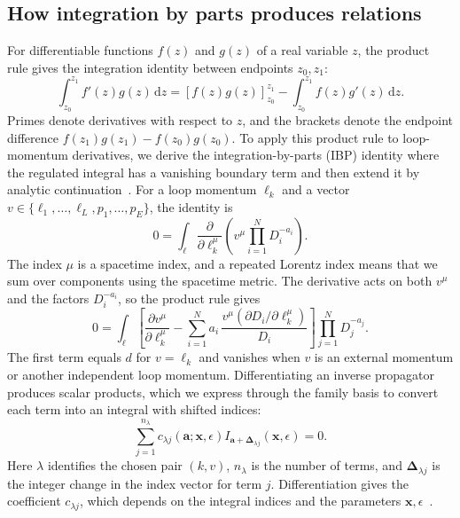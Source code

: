 \subsection{How integration by parts produces relations}
For differentiable functions $f(z)$ and $g(z)$ of a real variable $z$, the
product rule gives the integration identity between endpoints $z_0,z_1$:
\begin{equation}
 \int_{z_0}^{z_1} f'(z)g(z)\,\mathrm{d}z
 =[f(z)g(z)]_{z_0}^{z_1}
 -\int_{z_0}^{z_1} f(z)g'(z)\,\mathrm{d}z.
 \label{eq:ordinary-ibp}
\end{equation}
Primes denote derivatives with respect to $z$, and the brackets denote the
endpoint difference $f(z_1)g(z_1)-f(z_0)g(z_0)$. To apply this product rule
to loop-momentum derivatives, we derive the integration-by-parts (IBP)
identity where the regulated integral has a vanishing boundary term and then
extend it by analytic continuation~\cite{ChetyrkinTkachov,Weinzierl2022}.
For a loop momentum $\ell_k$ and a vector
$v\in\{\ell_1,\ldots,\ell_L,p_1,\ldots,p_E\}$, the identity is
\begin{equation}
 0=\int_{\ell}\frac{\partial}{\partial\ell_k^\mu}
       \left(v^\mu\prod_{i=1}^{N}D_i^{-a_i}\right).
 \label{eq:ibp}
\end{equation}
The index $\mu$ is a spacetime index, and a repeated Lorentz index means
that we sum over components using the spacetime metric. The derivative
acts on both $v^\mu$ and the factors $D_i^{-a_i}$, so the product rule gives
\begin{equation}
 0=\int_{\ell}\left[
 \frac{\partial v^\mu}{\partial\ell_k^\mu}
 -\sum_{i=1}^{N}a_i\,
   \frac{v^\mu(\partial D_i/\partial\ell_k^\mu)}{D_i}
 \right]\prod_{j=1}^{N}D_j^{-a_j}.
 \label{eq:ibp-expanded}
\end{equation}
The first term equals $d$ for $v=\ell_k$ and vanishes when $v$ is an
external momentum or another independent loop momentum. Differentiating
an inverse propagator produces scalar products, which we express through
the family basis to convert each term into an integral with shifted indices:
\begin{equation}
 \sum_{j=1}^{n_\lambda}
 c_{\lambda j}(\boldsymbol a;\boldsymbol x,\epsilon)
 I_{\boldsymbol a+\boldsymbol\Delta_{\lambda j}}
 (\boldsymbol x,\epsilon)=0.
 \label{eq:ibp-linear}
\end{equation}
Here $\lambda$ identifies the chosen pair $(k,v)$, $n_\lambda$ is the number of
terms, and $\boldsymbol\Delta_{\lambda j}$ is the integer change in the
index vector for term $j$. Differentiation gives the coefficient
$c_{\lambda j}$, which depends on the integral indices and the parameters
$\boldsymbol x,\epsilon$~\cite{ChetyrkinTkachov}.

